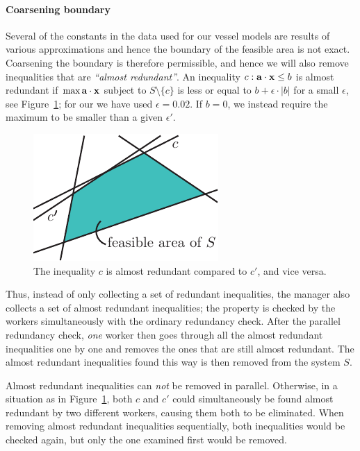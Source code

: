 \paragraph{Coarsening boundary} 
Several of the constants in the data used for our vessel models are results of various approximations and hence the boundary of the feasible area is not exact. Coarsening the boundary is therefore permissible, and hence we will also remove inequalities that are \emph{``almost redundant''}. An inequality $c: \mathbf{a}\cdot\mathbf{x}\leq b$ is almost redundant if $\max \mathbf{a}\cdot\mathbf{x}$  subject to $S\setminus\{c\}$ is less or equal to $b + \epsilon\cdot |b|$ for a small $\epsilon$, see Figure~\ref{fig:almostRedundant}; for our we have used $\epsilon = 0.02$. If $b=0$, we instead require the maximum to be smaller than a given $\epsilon'$. 

\begin{figure}[htbp]
	\centering
		\includegraphics[scale=0.9]{figures/almostRedundant.pdf}
	\caption{The inequality $c$ is almost redundant compared to $c'$, and vice versa.}
	\label{fig:almostRedundant}
\end{figure}

Thus, instead of only collecting a set of redundant inequalities, the manager also collects a set of almost redundant inequalities; the property is checked by the workers simultaneously with the ordinary redundancy check. After the parallel redundancy check, \emph{one} worker then goes through all the almost redundant inequalities one by one and removes the ones that are still almost redundant. The almost redundant inequalities found this way is then removed from the system $S$.  

Almost redundant inequalities can \emph{not} be removed in parallel. Otherwise, in a situation as in Figure~\ref{fig:almostRedundant}, both $c$ and $c'$ could simultaneously be found almost redundant by two different workers, causing them both to be eliminated. When removing almost redundant inequalities sequentially, both inequalities would be checked again, but only the one examined first would be removed.

